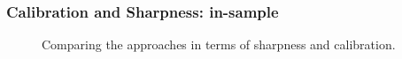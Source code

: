 \documentclass{beamer}
\begin{document}
  
\begin{frame}
\frametitle{Calibration and Sharpness: in-sample}

\begin{figure}[h!]
\caption[Optional caption for list of figures]{Comparing the approaches in terms of sharpness and calibration.}
\label{Calibration-Out}
\end{figure}

\end{frame}
\end{document}

